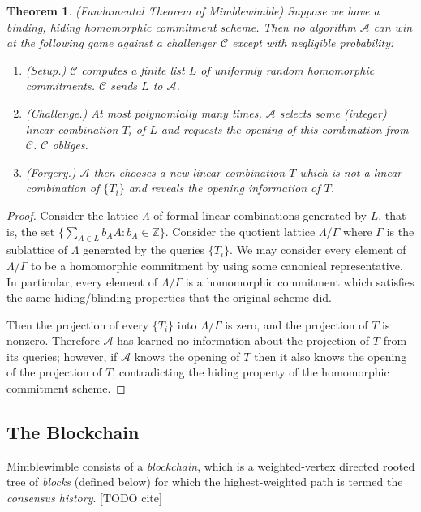 \documentclass[letterpaper]{article}
\newtheorem{thrm}{Theorem}
\begin{document}
\begin{thrm} (Fundamental Theorem of Mimblewimble) Suppose we have
a binding, hiding homomorphic commitment scheme. Then no algorithm
$\mathcal{A}$ can win at the following game against a challenger
$\mathcal{C}$ except with negligible probability:
\begin{enumerate}
\item (Setup.) $\mathcal{C}$ computes a finite list $L$ of uniformly
random homomorphic commitments. $\mathcal{C}$ sends $L$ to $\mathcal{A}$.
\item (Challenge.) At most polynomially many times, $\mathcal{A}$
selects some (integer) linear combination $T_i$ of $L$ and requests the
opening of this combination from $\mathcal{C}$. $\mathcal{C}$ obliges.
\item (Forgery.) $\mathcal{A}$ then chooses a new linear
combination $T$ which is not a linear combination of $\{T_i\}$ and reveals
the opening information of $T$.
\end{enumerate}
\label{fundamental}
\end{thrm}
\begin{proof}
Consider the lattice $\Lambda$ of formal linear combinations generated by $L$,
that is, the set $\{ \sum_{A\in L} b_A A : b_A \in \mathbb{Z}\}$. Consider the
quotient lattice $\Lambda/\Gamma$ where $\Gamma$ is the sublattice of
$\Lambda$ generated by the queries $\{T_i\}$. We may consider every
element of $\Lambda/\Gamma$ to be a homomorphic commitment by using
some canonical representative. In particular, every element of
$\Lambda/\Gamma$ is a homomorphic commitment which satisfies the same
hiding/blinding properties that the original scheme did.

Then the projection of every $\{T_i\}$ into $\Lambda/\Gamma$ is zero,
and the projection of $T$ is nonzero. Therefore $\mathcal{A}$ has
learned no information about the projection of $T$ from its queries;
however, if $\mathcal{A}$ knows the opening of $T$ then it also knows
the opening of the projection of $T$, contradicting the hiding
property of the homomorphic commitment scheme.
\end{proof}

\subsection{The Blockchain\label{sec:bc}}

Mimblewimble consists of a \emph{blockchain}, which is a weighted-vertex
directed rooted tree of \emph{blocks} (defined below) for which the
highest-weighted path is termed the \emph{consensus history}. [TODO cite]
\end{document}
